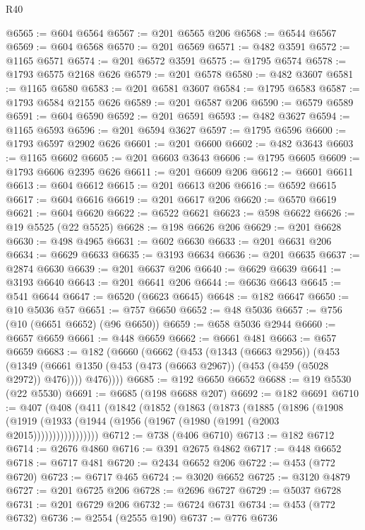 \begin{lexlean}{R40}
\begin{coremodule}
@6565 := @604 @6564
@6567 := @201 @6565 @206
@6568 := @6544 @6567
@6569 := @604 @6568
@6570 := @201 @6569
@6571 := @482 @3591
@6572 := @1165 @6571
@6574 := @201 @6572 @3591
@6575 := @1795 @6574
@6578 := @1793 @6575 @2168 @626
@6579 := @201 @6578
@6580 := @482 @3607
@6581 := @1165 @6580
@6583 := @201 @6581 @3607
@6584 := @1795 @6583
@6587 := @1793 @6584 @2155 @626
@6589 := @201 @6587 @206
@6590 := @6579 @6589
@6591 := @604 @6590
@6592 := @201 @6591
@6593 := @482 @3627
@6594 := @1165 @6593
@6596 := @201 @6594 @3627
@6597 := @1795 @6596
@6600 := @1793 @6597 @2902 @626
@6601 := @201 @6600
@6602 := @482 @3643
@6603 := @1165 @6602
@6605 := @201 @6603 @3643
@6606 := @1795 @6605
@6609 := @1793 @6606 @2395 @626
@6611 := @201 @6609 @206
@6612 := @6601 @6611
@6613 := @604 @6612
@6615 := @201 @6613 @206
@6616 := @6592 @6615
@6617 := @604 @6616
@6619 := @201 @6617 @206
@6620 := @6570 @6619
@6621 := @604 @6620
@6622 := @6522 @6621
@6623 := @598 @6622
@6626 := @19 @5525 (@22 @5525)
@6628 := @198 @6626 @206
@6629 := @201 @6628
@6630 := @498 @4965
@6631 := @602 @6630
@6633 := @201 @6631 @206
@6634 := @6629 @6633
@6635 := @3193 @6634
@6636 := @201 @6635
@6637 := @2874 @6630
@6639 := @201 @6637 @206
@6640 := @6629 @6639
@6641 := @3193 @6640
@6643 := @201 @6641 @206
@6644 := @6636 @6643
@6645 := @541 @6644
@6647 := @6520 (@6623 @6645)
@6648 := @182 @6647
@6650 := @10 @5036 @57
@6651 := @757 @6650
@6652 := @48 @5036
@6657 := @756 (@10 (@6651 @6652) (@96 @6650))
@6659 := @658 @5036 @2944
@6660 := @6657 @6659
@6661 := @448 @6659
@6662 := @6661 @481
@6663 := @657 @6659
@6683 := @182
    (@6660
      (@6662
        (@453
          (@1343 (@6663 @2956))
          (@453
            (@1349 (@6661 @1350 (@453 (@473 (@6663 @2967)) (@453 (@459 (@5028 @2972)) @476))))
            @476))))
@6685 := @192 @6650 @6652
@6688 := @19 @5530 (@22 @5530)
@6691 := @6685 (@198 @6688 @207)
@6692 := @182 @6691
@6710 := @407
    (@408
      (@411
        (@1842
          (@1852
            (@1863
              (@1873
                (@1885
                  (@1896
                    (@1908
                      (@1919 (@1933 (@1944 (@1956 (@1967 (@1980 (@1991 (@2003 @2015)))))))))))))))))
@6712 := @738 (@406 @6710)
@6713 := @182 @6712
@6714 := @2676 @4860
@6716 := @391 @2675 @4862
@6717 := @448 @6652
@6718 := @6717 @481
@6720 := @2434 @6652 @206
@6722 := @453 (@772 @6720)
@6723 := @6717 @465
@6724 := @3020 @6652
@6725 := @3120 @4879
@6727 := @201 @6725 @206
@6728 := @2696 @6727
@6729 := @5037 @6728
@6731 := @201 @6729 @206
@6732 := @6724 @6731
@6734 := @453 (@772 @6732)
@6736 := @2554 (@2555 @190)
@6737 := @776 @6736

\end{coremodule}
\end{lexlean}
